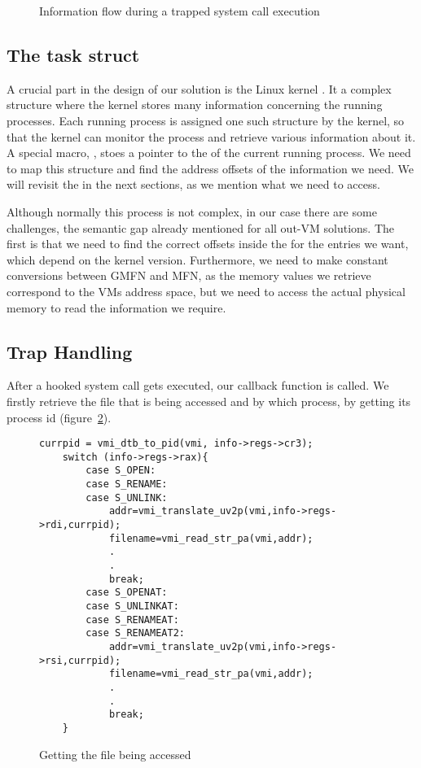 \begin{figure}[ht]
	\centering
	
	\caption{Information flow during a trapped system call execution}
	\label{fig:overview}
\end{figure}


\subsection{The task struct}\label{sub:struct}
A crucial part in the design of our solution is the Linux kernel . It a complex structure where the kernel stores many information concerning the running processes. Each running process is assigned one such structure by the kernel, so that the kernel can monitor the process and retrieve various information about it. A special macro, , stoes a pointer to the  of the current running process. We need to map this structure and find the address offsets of the information we need. We will revisit the  in the next sections, as we mention what we need to access.

\par Although normally this process is not complex, in our case there are some challenges, the semantic gap already mentioned for all out-\ac{VM} solutions. The first is that we need to find the correct offsets inside the  for the entries we want, which depend on the kernel version. Furthermore, we need to make constant conversions between \ac{GMFN} and \ac{MFN}, as the memory values we retrieve correspond to the \ac{VM}s address space, but we need to access the actual physical memory to read the information we require.


\subsection{Trap Handling}\label{sub:handling}

After a hooked system call gets executed, our callback function is called. We firstly retrieve the file that is being accessed and by which process, by getting its process id (figure~\ref{fig:getfile}). 

\begin{figure}[ht]
\selectfont
\begin{lstlisting}[style=CStyle]
	currpid = vmi_dtb_to_pid(vmi, info->regs->cr3);
	switch (info->regs->rax){
		case S_OPEN:
		case S_RENAME:
		case S_UNLINK:
			addr=vmi_translate_uv2p(vmi,info->regs->rdi,currpid);
			filename=vmi_read_str_pa(vmi,addr);
			.
			.
			break;
		case S_OPENAT:
		case S_UNLINKAT:
		case S_RENAMEAT:
		case S_RENAMEAT2:
			addr=vmi_translate_uv2p(vmi,info->regs->rsi,currpid);
			filename=vmi_read_str_pa(vmi,addr);
			.
			.
			break;	
	}
\end{lstlisting}
	\caption{Getting the file being accessed}
	\label{fig:getfile}
\end{figure}


